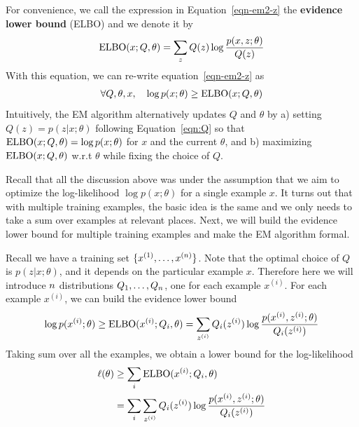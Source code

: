 \documentclass{article}
\begin{document}
\newcommand{\elbo}{\textup{ELBO}}

For convenience, we call the expression in Equation~\eqref{eqn-em2-z} the {\bf evidence lower bound} (ELBO) and we denote it by
\begin{align}
\elbo(x; Q, \theta) = \sum_{z} Q(z) \log \frac{p(x, z; \theta)}{Q(z)}  \label{eqn:elbo-z}
\end{align}
With this equation, we can re-write equation~\eqref{eqn-em2-z} as
\begin{align}
\forall Q, \theta, x,~~~ \log p(x;\theta) \ge \elbo(x;Q,\theta) \label{eqn-em3}
\end{align}
Intuitively, the EM algorithm alternatively updates $Q$ and $\theta$ by a) setting $Q(z) = p(z | x; \theta)$ following Equation~\eqref{eqn:Q} so that $\elbo(x;Q,\theta) = \log p(x;\theta)$ for $x$ and the current $\theta$, and b) maximizing $\elbo(x;Q,\theta)$ w.r.t $\theta$ while fixing the choice of $Q$. 

Recall that all the discussion above was under the assumption that we aim to optimize the log-likelihood $\log p(x;\theta)$ for a single example $x$. It turns out that with multiple training examples, the basic idea is the same and we only needs to take a sum over examples at relevant places. Next, we will build the evidence lower bound for multiple training examples and make the EM algorithm formal. 

Recall we have a training set $\{x^{(1)}, \ldots, x^{({n})}\}$. Note that the optimal choice of $Q$ is $p(z | x;\theta)$, and it depends on the particular example $x$. Therefore here we will introduce ${n}$ distributions $Q_1,\dots, Q_{{n}}$, one for each example $x^{(i)}$. For each example $x^{(i)}$, we can build the evidence lower bound 
\begin{align}
\log p(\xsi;\theta) \ge \elbo(\xsi; Q_i,\theta) = \sum_{\zsi} Q_i(\zsi) \log \frac{p(\xsi, \zsi; \theta)}{Q_i(\zsi)}\nonumber
\end{align}
Taking sum over all the examples, we obtain a lower bound for the log-likelihood 
\begin{align}
\ell(\theta) &\ge \sum_i \elbo(\xsi; Q_i,\theta) \label{eqn-em2} \\
& = \sum_i \sum_{\zsi} Q_i(\zsi) \log \frac{p(\xsi, \zsi; \theta)}{Q_i(\zsi)}\nonumber
\end{align}
\end{document}
